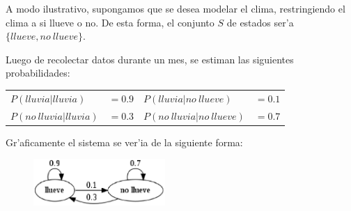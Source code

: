 A modo ilustrativo, supongamos que se desea modelar el clima, restringiendo el clima a si llueve o no. De esta forma, el conjunto $S$ de estados
ser'a $\{llueve, no\ llueve\}$. 

Luego de recolectar datos durante un mes, se estiman las siguientes probabilidades:

\begin{center}
\begin{tabular}{l l l l}
$P(lluvia | lluvia) $ & $=0.9$ & $P(lluvia | no\ llueve) $& $=0.1$\\
$P(no\ lluvia | lluvia)  $ & $=0.3$ & $P(no\ lluvia | no\ llueve) $ & $=0.7$\\
\end{tabular}
\end{center}

Gr'aficamente el sistema se ver'ia de la siguiente forma:

\begin{figure}[h]
\begin{center}
\includegraphics[width=5cm]{images/weather_graph.eps}
\end{center}
\end{figure}


